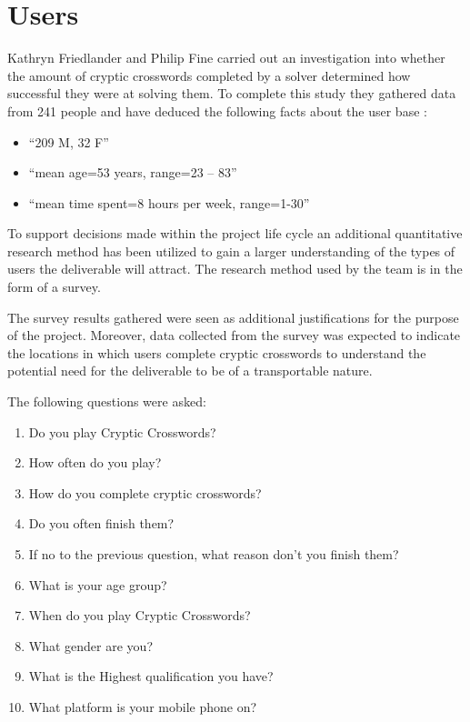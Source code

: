 \section{Users} 

Kathryn Friedlander and Philip Fine \citep{friedlander09} carried out an
investigation into whether the amount of cryptic crosswords completed by a
solver determined how successful they were at solving them. To complete this
study they gathered data from 241 people and have deduced the following facts 
about the user base \citep{friedlander09}:

\begin{itemize}
  \item ``209 M, 32 F''
  \item ``mean age=53 years, range=23 -- 83''
  \item ``mean time spent=8 hours per week, range=1-30''
\end{itemize}

To support decisions made within the project life cycle an additional
quantitative research method has been utilized to gain a larger understanding
of the types of users the deliverable will attract. The research method used by 
the team is in the form of a survey. 

The survey results gathered were seen as additional justifications for the 
purpose of the project. Moreover, data collected from the survey was expected to
indicate the locations in which users complete cryptic crosswords to understand 
the potential need for the deliverable to be of a transportable nature.

The following questions were asked:

\begin{enumerate}
  \item Do you play Cryptic Crosswords?
  \item How often do you play?
  \item How do you complete cryptic crosswords? %
  \item Do you often finish them?
  \item If no to the previous question, what reason don't you finish them?
  \item What is your age group?
  \item When do you play Cryptic Crosswords?
  \item What gender are you?
  \item What is the Highest qualification you have?
  \item What platform is your mobile phone on?
\end{enumerate}

